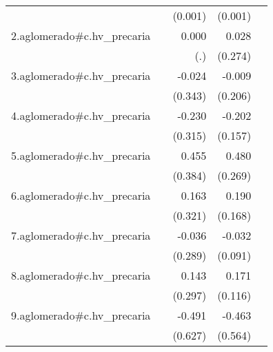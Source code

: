 {\begin{longtable}{l*{4}{D{.}{.}{-1}}}
            &                     &     (0.001)         &     (0.001)         &                     \\
\addlinespace
2.aglomerado#c.hv\_precaria&                     &       0.000         &       0.028         &                     \\
            &                     &         (.)         &     (0.274)         &                     \\
\addlinespace
3.aglomerado#c.hv\_precaria&                     &      -0.024         &      -0.009         &                     \\
            &                     &     (0.343)         &     (0.206)         &                     \\
\addlinespace
4.aglomerado#c.hv\_precaria&                     &      -0.230         &      -0.202         &                     \\
            &                     &     (0.315)         &     (0.157)         &                     \\
\addlinespace
5.aglomerado#c.hv\_precaria&                     &       0.455         &       0.480         &                     \\
            &                     &     (0.384)         &     (0.269)         &                     \\
\addlinespace
6.aglomerado#c.hv\_precaria&                     &       0.163         &       0.190         &                     \\
            &                     &     (0.321)         &     (0.168)         &                     \\
\addlinespace
7.aglomerado#c.hv\_precaria&                     &      -0.036         &      -0.032         &                     \\
            &                     &     (0.289)         &     (0.091)         &                     \\
\addlinespace
8.aglomerado#c.hv\_precaria&                     &       0.143         &       0.171         &                     \\
            &                     &     (0.297)         &     (0.116)         &                     \\
\addlinespace
9.aglomerado#c.hv\_precaria&                     &      -0.491         &      -0.463         &                     \\
            &                     &     (0.627)         &     (0.564)         &                     \\

\end{longtable}}
